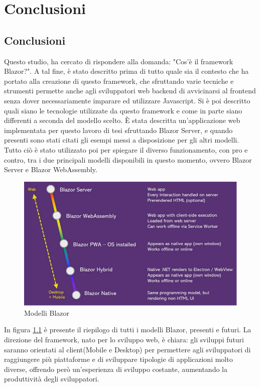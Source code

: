 \chapter{Conclusioni}\label{cap:conclusioni}
\section{Conclusioni}\label{sez:conclusioni}
Questo studio, ha cercato di rispondere alla domanda: "Cos'\`e il framework Blazor?".
A tal fine, \`e stato descritto prima di tutto quale sia il contesto che ha portato alla creazione di questo framework, che sfruttando varie tecniche e strumenti permette anche agli sviluppatori web backend di avvicinarsi al frontend senza dover necessariamente imparare ed utilizzare Javascript.
Si \`e poi descritto quali siano le tecnologie utilizzate da questo framework e come in parte siano differenti a seconda del modello scelto.
\`E stata descritta un'applicazione web implementata per questo lavoro di tesi sfruttando Blazor Server, e quando presenti sono stati citati gli esempi messi a disposizione per gli altri modelli.
Tutto ci\`o \`e stato utilizzato poi per spiegare il diverso funzionamento, con pro e contro, tra i due principali modelli disponibili in questo momento, ovvero Blazor Server e Blazor WebAssembly. 

\begin{figure}[H]
	\centerline{\includegraphics[scale=0.5]{figure/BlazorModels.PNG}}
	\caption{Modelli Blazor}
	\label{fig:blazorModels}
\end{figure}

In figura \ref{fig:blazorModels} \`e presente il riepilogo di tutti i modelli Blazor, presenti e futuri.
La direzione del framework, nato per lo sviluppo web, \`e chiara: gli sviluppi futuri saranno orientati al client(Mobile e Desktop) per permettere agli sviluppatori di raggiungere pi\`u piattaforme e di sviluppare tipologie di applicazioni molto diverse, offrendo per\`o un'esperienza di sviluppo costante, aumentando la produttivit\`a degli sviluppatori.

